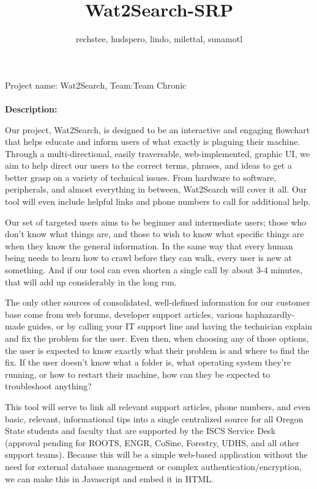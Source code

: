 \documentclass[12pt, letterpaper]{article}
\title{Wat2Search-SRP}
\author{rechstee, hudspero, lindo, milettal, sunamotl 
}
\begin{document}
\maketitle Project name: Wat2Search, Team:Team Chronic
	\\\\\textbf{Description:}
	
	Our project, Wat2Search, is designed to be an interactive and engaging flowchart that helps educate and inform users of what exactly is plaguing their machine. Through a multi-directional, easily traversable, web-implemented, graphic UI, we aim to help direct our users to the correct terms, phrases, and ideas to get a better grasp on a variety of technical issues. From hardware to software, peripherals, and almost everything in between, Wat2Search will cover it all. Our tool will even include helpful links and phone numbers to call for additional help.
	
	Our set of targeted users aims to be beginner and intermediate users; those who don’t know what things are, and those to wish to know what specific things are when they know the general information. In the same way that every human being needs to learn how to crawl before they can walk, every user is new at something. And if our tool can even shorten a single call by about 3-4 minutes, that will add up considerably in the long run.
	
	The only other sources of consolidated, well-defined information for our customer base come from web forums, developer support articles, various haphazardly-made guides, or by calling your IT support line and having the technician explain and fix the problem for the user. Even then, when choosing any of those options, the user is expected to know exactly what their problem is and where to find the fix. If the user doesn’t know what a folder is, what operating system they’re running, or how to restart their machine, how can they be expected to troubleshoot anything?
	
	This tool will serve to link all relevant support articles, phone numbers, and even basic, relevant, informational tips into a single centralized source for all Oregon State students and faculty that are supported by the ISCS Service Desk (approval pending for ROOTS, ENGR, CoSine, Forestry, UDHS, and all other support teams). Because this will be a simple web-based application without the need for external database management or complex authentication/encryption, we can make this in Javascript and embed it in HTML. 
	
\end{document}
